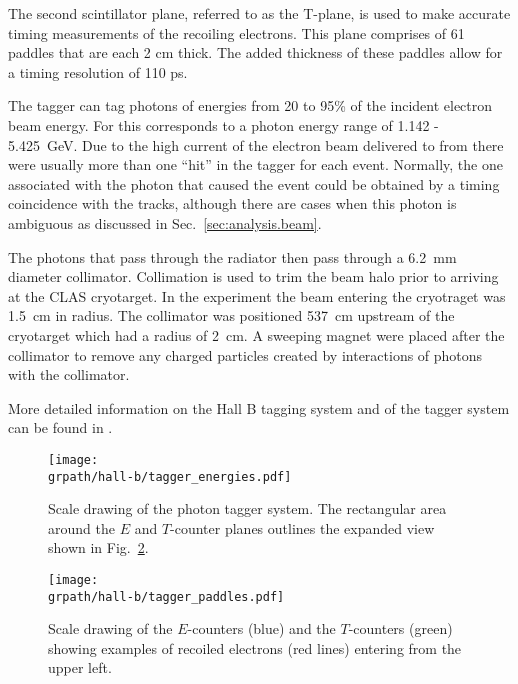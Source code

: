 The second scintillator plane, referred to as the T-plane, is used to make accurate timing measurements of the recoiling electrons. This plane comprises of 61 paddles that are each 2 cm thick. The added thickness of these paddles allow for a timing resolution of 110 ps.

The tagger can tag photons of energies from 20 to 95\% of the incident electron beam energy. For  this corresponds to a photon energy range of 1.142 - 5.425~GeV. Due to the high current of the electron beam delivered to  from  there were usually more than one ``hit'' in the tagger for each event. Normally, the one associated with the photon that caused the event could be obtained by a timing coincidence with the tracks, although there are cases when this photon is ambiguous as discussed in Sec.~\ref{sec:analysis.beam}.

The photons that pass through the radiator then pass through a 6.2~mm diameter collimator. Collimation is used to trim the beam halo prior to arriving at the CLAS cryotarget. In the  experiment the beam entering the cryotraget was 1.5~cm in radius. The collimator was positioned 537~cm upstream of the cryotarget which had a radius of 2~cm. A sweeping magnet were placed after the collimator to remove any charged particles created by interactions of photons with the collimator.

More detailed information on the Hall B tagging system and  of the tagger system can be found in \cite{clas.tagger}.

\begin{figure}\begin{center}
\texttt{[image: \\grpath/hall-b/tagger\_energies.pdf]}
\caption[Scale drawing of the photon tagger system]{\label{fig:jlab.tagr.energies}Scale drawing of the photon tagger system. The rectangular area around the $E$ and $T$-counter planes outlines the expanded view shown in Fig.~\ref{fig:jlab.tagr.paddles}.}
\end{center}\end{figure}


\begin{figure}\begin{center}
\texttt{[image: \\grpath/hall-b/tagger\_paddles.pdf]}
\caption[Scale drawing of the $E$-counters (blue) and the $T$-counters (green) showing examples of recoiled electrons (red lines) entering from the upper left]{\label{fig:jlab.tagr.paddles}{}Scale drawing of the $E$-counters (blue) and the $T$-counters (green) showing examples of recoiled electrons (red lines) entering from the upper left.}
\end{center}\end{figure}
\FloatBarrier
